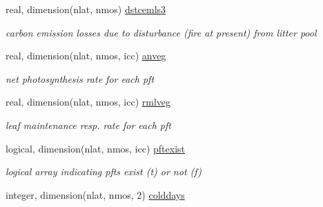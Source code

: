 \begin{DoxyCompactItemize}
\item 
\hypertarget{structctem__statevars_1_1veg__rot_ad7c664082cbe10d3ae5410aa87dbbdf7}{}real, dimension(nlat, nmos) \hyperlink{structctem__statevars_1_1veg__rot_ad7c664082cbe10d3ae5410aa87dbbdf7}{dstcemls3}\label{structctem__statevars_1_1veg__rot_ad7c664082cbe10d3ae5410aa87dbbdf7}

\begin{DoxyCompactList}\small\item\em carbon emission losses due to disturbance (fire at present) from litter pool \end{DoxyCompactList}\item 
\hypertarget{structctem__statevars_1_1veg__rot_a7549ae73e78430706729db3e80b13142}{}real, dimension(nlat, nmos, icc) \hyperlink{structctem__statevars_1_1veg__rot_a7549ae73e78430706729db3e80b13142}{anveg}\label{structctem__statevars_1_1veg__rot_a7549ae73e78430706729db3e80b13142}

\begin{DoxyCompactList}\small\item\em net photosynthesis rate for each pft \end{DoxyCompactList}\item 
\hypertarget{structctem__statevars_1_1veg__rot_ad9aec62ab0c237b063115c945a974484}{}real, dimension(nlat, nmos, icc) \hyperlink{structctem__statevars_1_1veg__rot_ad9aec62ab0c237b063115c945a974484}{rmlveg}\label{structctem__statevars_1_1veg__rot_ad9aec62ab0c237b063115c945a974484}

\begin{DoxyCompactList}\small\item\em leaf maintenance resp. rate for each pft \end{DoxyCompactList}\item 
\hypertarget{structctem__statevars_1_1veg__rot_ada8413d2cf1b2248ab9f65414d42f959}{}logical, dimension(nlat, nmos, icc) \hyperlink{structctem__statevars_1_1veg__rot_ada8413d2cf1b2248ab9f65414d42f959}{pftexist}\label{structctem__statevars_1_1veg__rot_ada8413d2cf1b2248ab9f65414d42f959}

\begin{DoxyCompactList}\small\item\em logical array indicating pfts exist (t) or not (f) \end{DoxyCompactList}\item 
\hypertarget{structctem__statevars_1_1veg__rot_afb7b370a77d58a160552507121d6da3e}{}integer, dimension(nlat, nmos, 2) \hyperlink{structctem__statevars_1_1veg__rot_afb7b370a77d58a160552507121d6da3e}{colddays}\label{structctem__statevars_1_1veg__rot_afb7b370a77d58a160552507121d6da3e}


\end{DoxyCompactItemize}
